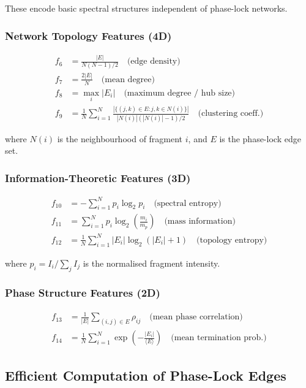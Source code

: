 \documentclass[twocolumn,10pt,a4paper]{article}
\theoremstyle{definition}
\theoremstyle{remark}
\begin{document}
These encode basic spectral structures independent of phase-lock networks.

\subsubsection{Network Topology Features (4D)}

\begin{align}
f_6 &= \frac{|E|}{N(N-1)/2} \quad \text{(edge density)} \\
f_7 &= \frac{2|E|}{N} \quad \text{(mean degree)} \\
f_8 &= \max_i |E_i| \quad \text{(maximum degree / hub size)} \\
f_9 &= \frac{1}{N}\sum_{i=1}^{N} \frac{|\{(j,k) \in E : j,k \in N(i)\}|}{|N(i)|(|N(i)|-1)/2} \quad \text{(clustering coeff.)}
\end{align}

where $N(i)$ is the neighbourhood of fragment $i$, and $E$ is the phase-lock edge set.

\subsubsection{Information-Theoretic Features (3D)}

\begin{align}
f_{10} &= -\sum_{i=1}^{N} p_i \log_2 p_i \quad \text{(spectral entropy)} \\
f_{11} &= \sum_{i=1}^{N} p_i \log_2\left(\frac{m_i}{m_p}\right) \quad \text{(mass information)} \\
f_{12} &= \frac{1}{N}\sum_{i=1}^{N} |E_i| \log_2(|E_i|+1) \quad \text{(topology entropy)}
\end{align}

where $p_i = I_i / \sum_j I_j$ is the normalised fragment intensity.

\subsubsection{Phase Structure Features (2D)}

\begin{align}
f_{13} &= \frac{1}{|E|}\sum_{(i,j) \in E} \rho_{ij} \quad \text{(mean phase correlation)} \\
f_{14} &= \frac{1}{N}\sum_{i=1}^{N} \exp\left(-\frac{|E_i|}{\langle E \rangle}\right) \quad \text{(mean termination prob.)}
\end{align}

\subsection{Efficient Computation of Phase-Lock Edges}
\end{document}
